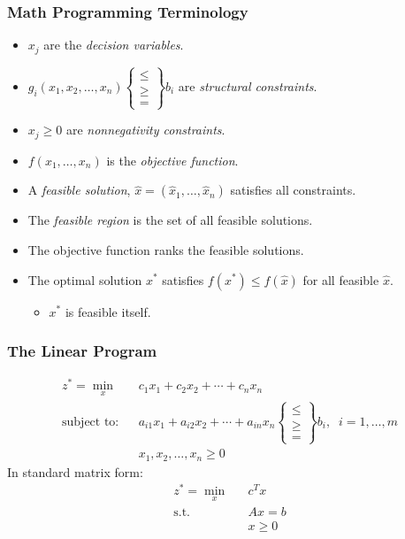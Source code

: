 \documentclass[12pt,handout]{beamer}
\begin{document}
\begin{frame}
\frametitle{Math Programming Terminology}
\begin{itemize}
\item $x_j$ are the {\em decision variables}.
\item $g_i(x_1, x_2, \ldots, x_n) \begin{Bmatrix}   \le \\
                    \ge \\
                    =
\end{Bmatrix} b_i$ are {\em structural constraints}.
\item $x_j \ge 0$ are {\em nonnegativity constraints}.
\item $f(x_1, \ldots, x_n)$ is the {\em objective function}.
\item A {\em feasible solution}, $\hat{x} = (\hat{x}_1, \ldots, \hat{x}_n)$ satisfies all constraints.
\item The {\em feasible region} is the set of all feasible solutions.
\item The objective function ranks the feasible solutions.
\item The optimal solution $x^*$ satisfies $f(x^*) \le f(\hat{x})$ for all feasible $\hat{x}$.
\begin{itemize}
\item $x^*$ is feasible itself.
\end{itemize}
\end{itemize}
\end{frame}

\begin{frame}
\frametitle{The Linear Program}
\begin{eqnarray}
z^* = \min_x && c_1 x_1 + c_2 x_2 + \cdots + c_n x_n \nonumber \\
\mbox{subject to:} &&a_{i1} x_1 + a_{i2} x_2 + \cdots + a_{in} x_n
\begin{Bmatrix}   \le \\
                   \ge \\
                    =
\end{Bmatrix}
b_i,\;\;i = 1,\ldots,m \nonumber \\
&&x_1, x_2, \ldots, x_n \ge 0 \nonumber
\end{eqnarray}
In standard matrix form:
\begin{eqnarray}
z^* = \min_{x} && c^T x \nonumber \\
\mbox{s.t.} && Ax = b \nonumber \\
&& x \ge 0 \nonumber
\end{eqnarray}
\end{frame}
\end{document}

